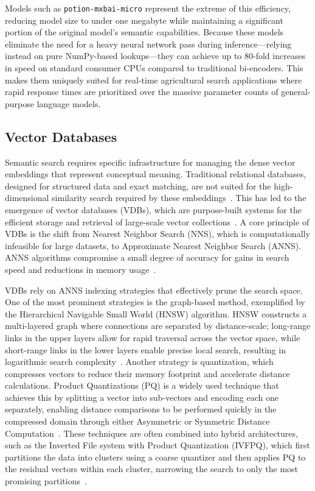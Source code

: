 \documentclass[journal]{./IEEE/IEEEtran}
\begin{document}
Models such as \texttt{potion-mxbai-micro} represent the extreme of this efficiency, reducing model size to under one megabyte while maintaining a significant portion of the original model's semantic capabilities. Because these models eliminate the need for a heavy neural network pass during inference—relying instead on pure NumPy-based lookups—they can achieve up to 80-fold increases in speed on standard consumer CPUs compared to traditional bi-encoders. This makes them uniquely suited for real-time agricultural search applications where rapid response times are prioritized over the massive parameter counts of general-purpose language models.

\subsection{Vector Databases}
Semantic search requires specific infrastructure for managing the dense vector embeddings that represent conceptual meaning. Traditional relational databases, designed for structured data and exact matching, are not suited for the high-dimensional similarity search required by these embeddings~\cite{ma_comprehensive_2025}. This has led to the emergence of vector databases (VDBs), which are purpose-built systems for the efficient storage and retrieval of large-scale vector collections~\cite{monir_vectorsearch_2024}. A core principle of VDBs is the shift from Nearest Neighbor Search (NNS), which is computationally infeasible for large datasets, to Approximate Nearest Neighbor Search (ANNS). ANNS algorithms compromise a small degree of accuracy for gains in search speed and reductions in memory usage~\cite{ma_comprehensive_2025, douze_faiss_2025}.

VDBs rely on ANNS indexing strategies that effectively prune the search space. One of the most prominent strategies is the graph-based method, exemplified by the Hierarchical Navigable Small World (HNSW) algorithm. HNSW constructs a multi-layered graph where connections are separated by distance-scale; long-range links in the upper layers allow for rapid traversal across the vector space, while short-range links in the lower layers enable precise local search, resulting in logarithmic search complexity~\cite{malkov_efficient_2020}. Another strategy is quantization, which compresses vectors to reduce their memory footprint and accelerate distance calculations. Product Quantizations (PQ) is a widely used technique that achieves this by splitting a vector into sub-vectors and encoding each one separately, enabling distance comparisons to be performed quickly in the compressed domain through either Asymmetric or Symmetric Distance Computation~\cite{douze_faiss_2025}. These techniques are often combined into hybrid architectures, such as the Inverted File system with Product Quantization (IVFPQ), which first partitions the data into clusters using a coarse quantizer and then applies PQ to the residual vectors within each cluster, narrowing the search to only the most promising partitions~\cite{ma_comprehensive_2025, douze_faiss_2025}.
\end{document}
